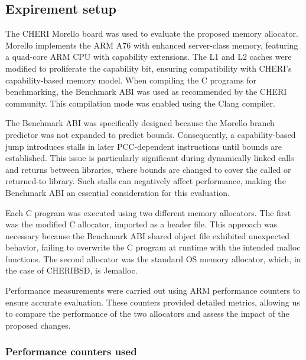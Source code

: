 \documentclass[11pt]{article}
\begin{document}
\subsection{Expirement setup}
\label{sec:org0672379}

The CHERI Morello board was used to evaluate the proposed memory allocator. 
Morello implements the ARM A76 with enhanced server-class memory, featuring a 
quad-core ARM CPU with capability extensions. The L1 and L2 caches were modified 
to proliferate the capability bit, ensuring compatibility with CHERI's capability-based 
memory model. When compiling the C programs for benchmarking, the Benchmark ABI was 
used as recommended by the CHERI community. This compilation mode was enabled using 
the Clang compiler.

The Benchmark ABI was specifically designed because the Morello branch predictor 
was not expanded to predict bounds. Consequently, a capability-based jump introduces 
stalls in later PCC-dependent instructions until bounds are established. This issue 
is particularly significant during dynamically linked calls and returns between 
libraries, where bounds are changed to cover the called or returned-to library. 
Such stalls can negatively affect performance, making the Benchmark ABI an essential 
consideration for this evaluation.

Each C program was executed using two different memory allocators. The first was 
the modified C allocator, imported as a header file. This approach was necessary 
because the Benchmark ABI shared object file exhibited unexpected behavior, 
failing to overwrite the C program at runtime with the intended malloc functions. 
The second allocator was the standard OS memory allocator, which, in the case of
CHERIBSD, is Jemalloc.

Performance measurements were carried out using ARM performance counters to 
ensure accurate evaluation. These counters provided detailed metrics, allowing 
us to compare the performance of the two allocators and assess the impact of 
the proposed changes.

\subsubsection{Performance counters used}
\label{sec:org9f2d2f7}
\end{document}
